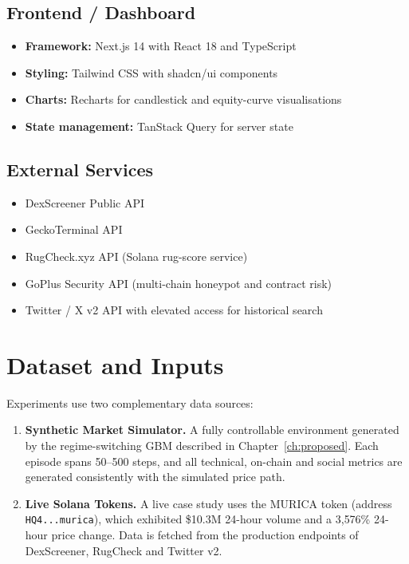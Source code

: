 \documentclass[12pt,a4paper,oneside,openany]{book}
\begin{document}
\subsection{Frontend / Dashboard}
\begin{itemize}[leftmargin=8mm]
\item \textbf{Framework:} Next.js 14 with React 18 and TypeScript
\item \textbf{Styling:} Tailwind CSS with shadcn/ui components
\item \textbf{Charts:} Recharts for candlestick and equity-curve visualisations
\item \textbf{State management:} TanStack Query for server state
\end{itemize}

\subsection{External Services}
\begin{itemize}[leftmargin=8mm]
\item DexScreener Public API
\item GeckoTerminal API
\item RugCheck.xyz API (Solana rug-score service)
\item GoPlus Security API (multi-chain honeypot and contract risk)
\item Twitter / X v2 API with elevated access for historical search
\end{itemize}

\section{Dataset and Inputs}
Experiments use two complementary data sources:

\begin{enumerate}[leftmargin=12mm]
\item \textbf{Synthetic Market Simulator.} A fully controllable environment generated by the regime-switching GBM described in Chapter~\ref{ch:proposed}. Each episode spans 50--500 steps, and all technical, on-chain and social metrics are generated consistently with the simulated price path.
\item \textbf{Live Solana Tokens.} A live case study uses the MURICA token (address \texttt{HQ4...murica}), which exhibited \$10.3M 24-hour volume and a 3{,}576\% 24-hour price change. Data is fetched from the production endpoints of DexScreener, RugCheck and Twitter v2.
\end{enumerate}
\end{document}
